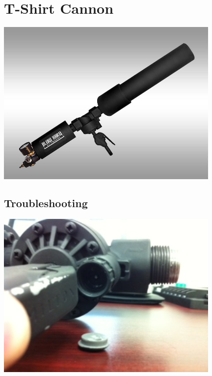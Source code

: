 \documentclass[letterpaper,12pt]{article}
\begin{document}
\section{T-Shirt Cannon}
\begin{center}
    \includegraphics[width=11cm]{pics/cannon/blowhard_cannon.jpg}
\end{center}

\subsection{Troubleshooting}
\begin{center}
    \includegraphics[width=11cm]{pics/cannon/broken_release_valve.jpg}
\end{center}
\end{document}
